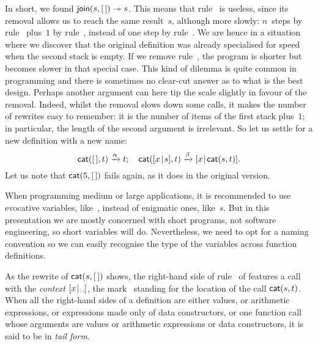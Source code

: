 In short, we found \(\textsf{join}(s,[\,]) \twoheadrightarrow s\).
This means that rule~\clause{\beta} is useless, since its removal
allows us to reach the same result~\(s\), although more slowly:
\(n\)~steps by rule~\clause{\gamma} plus~\(1\) by
rule~\clause{\alpha}, instead of one step by
rule~\clause{\beta}. We are hence in a situation where we discover
that the original definition was already specialised for speed when
the second stack is empty. If we remove rule~\clause{\beta}, the
program is shorter but becomes slower in that special case. This kind
of dilemma is quite common in programming and there is sometimes no
clear\hyp{}cut answer as to what is the best design. Perhaps another
argument can here tip the scale slightly in favour of the
removal. Indeed, whilst the removal slows down some calls, it makes
the number of rewrites easy to remember: it is the number of items of
the first stack plus~\(1\); in particular, the length of the second
argument is irrelevant. So let us settle for a new definition with a
new name:
\begin{equation*}
\textsf{cat}([\,],t) \xrightarrow{\alpha} t;\quad
\textsf{cat}([{x}\!\mid\!{s}],t) \xrightarrow{\beta} [{x}\!\mid\!{\textsf{cat}(s,t)}].
\end{equation*}
Let us note that \(\textsf{cat}(5,[\,])\) fails again, as it does in the
original version.

When programming medium or large applications, it is recommended to
use evocative variables, like~, instead of
enigmatic ones, like~\(s\). But in this presentation we are mostly
concerned with short programs, not software engineering, so short
variables will do. Nevertheless, we need to opt for a naming
convention so we can easily recognise the type of the variables across
function definitions.


As the rewrite of \(\textsf{cat}(s,[\,])\) shows, the right\hyp{}hand side
of rule~\clause{\beta} of  features a call with the
\emph{context} \(\cons{x}{\text{\textvisiblespace}}\), the
mark~\textvisiblespace{} standing for the location of the call
\(\textsf{cat}(s,t)\). When all the right\hyp{}hand sides of a definition
are either values, or arithmetic expressions, or expressions made only
of data constructors, or one function call whose arguments are values
or arithmetic expressions or data constructors, it is said to be in
\emph{tail form}.

